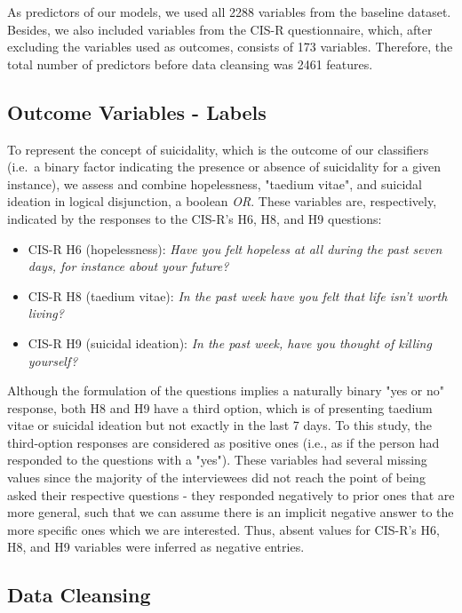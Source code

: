 As predictors of our models, we used all 2288 variables from the baseline dataset.
Besides, we also included variables from the CIS-R questionnaire, which, after excluding the variables used as outcomes, consists of 173 variables.
Therefore, the total number of predictors before data cleansing was 2461 features.

\subsection{Outcome Variables - Labels}\label{subsec:labels}

To represent the concept of suicidality, which is the outcome of our classifiers (i.e.\ a binary factor indicating the presence or absence of suicidality for a given instance), we assess and combine hopelessness, "taedium vitae", and suicidal ideation in logical disjunction, a boolean \textit{OR}.
These variables are, respectively, indicated by the responses to the CIS-R's H6, H8, and H9 questions:
\begin{itemize}
    \item CIS-R H6 (hopelessness): \textit{Have you felt hopeless at all during the past seven days, for instance about your future?}
    \item CIS-R H8 (taedium vitae): \textit{In the past week have you felt that life isn't worth living?}
    \item CIS-R H9 (suicidal ideation): \textit{In the past week, have you thought of killing yourself?}
\end{itemize}

Although the formulation of the questions implies a naturally binary "yes or no" response, both H8 and H9 have a third option, which is of presenting taedium vitae or suicidal ideation but not exactly in the last 7 days.
To this study, the third-option responses are considered as positive ones (i.e., as if the person had responded to the questions with a "yes").
These variables had several missing values since the majority of the interviewees did not reach the point of being asked their respective questions - they responded negatively to prior ones that are more general, such that we can assume there is an implicit negative answer to the more specific ones which we are interested.
Thus, absent values for CIS-R's H6, H8, and H9 variables were inferred as negative entries.

\subsection{Data Cleansing}\label{subsec:cleansing}

